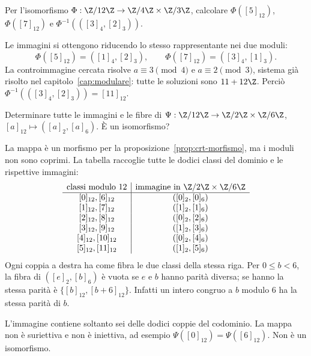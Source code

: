 \begin{esercizio}
Per l'isomorfismo $\Phi:\Z/12\Z\to\Z/4\Z\times\Z/3\Z$, calcolare $\Phi([5]_{12})$, $\Phi([7]_{12})$ e $\Phi^{-1}(([3]_4,[2]_3))$.
\end{esercizio}
\begin{svolgimento}
Le immagini si ottengono riducendo lo stesso rappresentante nei due moduli:
\[
\Phi([5]_{12})=([1]_4,[2]_3),\qquad
\Phi([7]_{12})=([3]_4,[1]_3).
\]
La controimmagine cercata risolve $a\equiv3\pmod4$ e $a\equiv2\pmod3$, sistema già risolto nel capitolo~\ref{cap:modulare}: tutte le soluzioni sono $11+12\Z$. Perciò $\Phi^{-1}(([3]_4,[2]_3))=[11]_{12}$.
\end{svolgimento}

\begin{esercizio}
Determinare tutte le immagini e le fibre di $\Psi:\Z/12\Z\to\Z/2\Z\times\Z/6\Z$, $[a]_{12}\mapsto([a]_2,[a]_6)$. È un isomorfismo?
\end{esercizio}
\begin{svolgimento}
La mappa è un morfismo per la proposizione~\ref{prop:crt-morfismo}, ma i moduli non sono coprimi. La tabella raccoglie tutte le dodici classi del dominio e le rispettive immagini:
\[
\begin{array}{c|c}
\text{classi modulo }12&\text{immagine in }\Z/2\Z\times\Z/6\Z\\\hline
{[0]_{12}},[6]_{12}&([0]_2,[0]_6)\\
{[1]_{12}},[7]_{12}&([1]_2,[1]_6)\\
{[2]_{12}},[8]_{12}&([0]_2,[2]_6)\\
{[3]_{12}},[9]_{12}&([1]_2,[3]_6)\\
{[4]_{12}},[10]_{12}&([0]_2,[4]_6)\\
{[5]_{12}},[11]_{12}&([1]_2,[5]_6)
\end{array}
\]
Ogni coppia a destra ha come fibra le due classi della stessa riga. Per $0\le b<6$, la fibra di $([e]_2,[b]_6)$ è vuota se $e$ e $b$ hanno parità diversa; se hanno la stessa parità è $\{[b]_{12},[b+6]_{12}\}$. Infatti un intero congruo a $b$ modulo $6$ ha la stessa parità di $b$.

L'immagine contiene soltanto sei delle dodici coppie del codominio. La mappa non è suriettiva e non è iniettiva, ad esempio $\Psi([0]_{12})=\Psi([6]_{12})$. Non è un isomorfismo.
\end{svolgimento}

